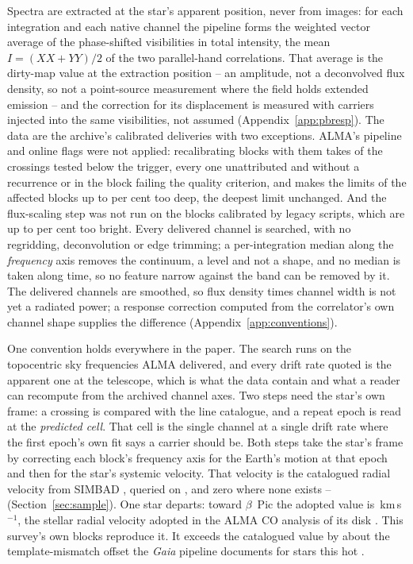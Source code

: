 Spectra are extracted at the star's apparent position, never from images: for
each integration and each native channel the pipeline forms the weighted vector
average of the phase-shifted visibilities in total intensity, the mean
$I=(XX+YY)/2$ of the two parallel-hand correlations. That average is the
dirty-map value at the extraction position -- an amplitude, not a deconvolved
flux density, so not a point-source measurement where the field holds extended
emission -- and the correction for its displacement is measured with
carriers injected into the same visibilities, not assumed
(Appendix~\ref{app:pbresp}). The data are the archive's calibrated deliveries
with two exceptions. ALMA's pipeline and online flags were not applied:
recalibrating \FgNEbMeas{} blocks with them takes \FgNCrossFallWord{} of the
\FgNCrossMeas{} crossings tested below the trigger, every one unattributed and
without a recurrence or in the block failing the quality criterion, and makes
the limits of the affected blocks up to \FgLimDeepMaxPct{} per cent too deep,
the deepest limit unchanged. And the flux-scaling step was not run on the
\LgNEbFluxWord{} blocks calibrated by legacy scripts, which are up to
\LgFluxMaxPct{} per cent too bright. Every
delivered channel is searched, with no regridding, deconvolution or edge trimming;
a per-integration median along the \emph{frequency} axis removes the
continuum, a level and not a shape, and no median is taken along time, so no
feature narrow against the band can be removed by it. The
delivered channels are smoothed, so flux density times channel width is not
yet a radiated power; a response correction computed from the correlator's
own channel shape supplies the difference (Appendix~\ref{app:conventions}).

One convention holds everywhere in the paper. The search runs on the
topocentric sky frequencies ALMA delivered, and every drift rate quoted is the
apparent one at the telescope, which is what the data contain and what a reader
can recompute from the archived channel axes. Two steps need the star's own
frame: a crossing is compared with the line catalogue, and a repeat epoch is
read at the \emph{predicted cell}. That cell is the single channel at a single
drift rate where the first epoch's own fit says a carrier should be. Both steps
take the star's frame by correcting each block's frequency axis for the
Earth's motion at that epoch and then for the star's systemic velocity. That
velocity is the catalogued radial velocity from SIMBAD \citep{SIMBAD2000},
queried on \SimbadQueryDate, and zero where none exists --
\FrZeroVsysClause{} (Section~\ref{sec:sample}). One star departs: toward $\beta$~Pic the
adopted value is \BpRecVsys\,km\,s$^{-1}$, the stellar radial velocity adopted
in the ALMA CO analysis of its disk \citep{Matra2017}. This survey's own
blocks reproduce it. It exceeds the catalogued value by about the
template-mismatch offset the \textit{Gaia} pipeline documents for stars this
hot \citep{Blomme2023}.

